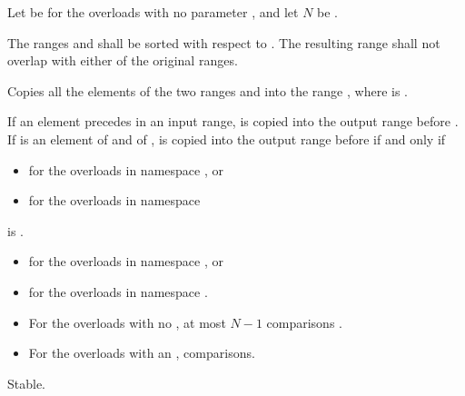 \begin{itemdescr}
\begin{newnewblock}
\pnum
Let  be  for the overloads with no parameter
, and let $N$ be .
\end{newnewblock}

\pnum
\requires The ranges  and  shall be
sorted with respect to  .
The resulting range shall not overlap with either of the original ranges.

\pnum
\effects Copies all the elements of the two ranges  and
 into the range , where
 is
.
\begin{newnewblock}
If an element  precedes  in an input range,  is
copied into the output range before . If  is an element of
 and  of ,  is
copied into the output range before  if and only if
\begin{itemize}
\item {} for the overloads in namespace , or
\item {}
  for the overloads in namespace 
\end{itemize}
is .
\end{newnewblock}

\pnum
\returns {}
\begin{newnewblock}
\begin{itemize}
\item {} for the overloads in namespace , or
\item {} for the overloads in
  namespace .
\end{itemize}
\end{newnewblock}

\pnum
\complexity {}
\begin{itemize}
\item For the overloads with no ,
  at most $N - 1$ comparisons .
\item For the overloads with an ,
   comparisons.
\end{itemize}

\pnum
\remarks Stable.
\end{itemdescr}


